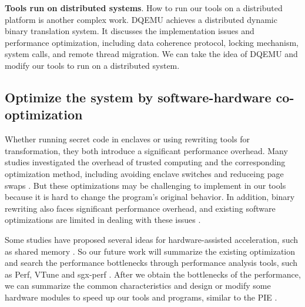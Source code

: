 \textbf{Tools run on distributed systems}.
How to run our tools on a distributed platform is another complex work.
DQEMU \cite{Zhao2020DQEMUAS} achieves a distributed dynamic binary translation system.
It discusses the implementation issues and performance optimization, including
data coherence protocol, locking mechanism, system calls, and remote thread migration.
We can take the idea of DQEMU and modify our tools to run on a distributed system.

\subsection{Optimize the system by software-hardware co-optimization}
\label{sec:ToolWithOptimization}
Whether running secret code in enclaves or using rewriting tools for transformation,
they both introduce a significant performance overhead.
Many studies investigated the overhead of trusted computing and
the corresponding optimization method, including avoiding enclave switches
\cite{Tian2018SwitchlessCM} and reduceing page swaps \cite{Orenbach2017EleosEO, Taassori2018VAULTRP}.
But these optimizations may be challenging to implement in our tools because it is hard
to change the program's original behavior.
In addition, binary rewriting also faces significant performance overhead, and existing
software optimizations are limited in dealing with these issues \cite{Kim2003HardwareSF}.

Some studies have proposed several ideas for hardware-assisted acceleration, such as
shared memory \cite{Jiang2022CRONUSFS}.
So our future work will summarize the existing optimization and search the performance
bottlenecks through performance analysis tools, such as Perf, VTune and sgx-perf \cite{Weichbrodt2018sgxperfAP}.
After we obtain the bottlenecks of the performance, we can summarize the common characteristics
and design or modify some hardware modules to speed up our tools and programs, similar to
the PIE \cite{Schneider2021PIEAP}.